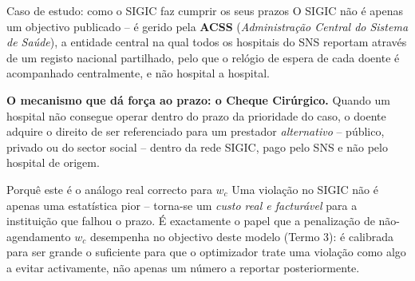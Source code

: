 \documentclass[10pt,aspectratio=169]{beamer}
\begin{document}
\begin{frame}{Caso de estudo: como o SIGIC faz cumprir os seus prazos}
  O SIGIC n\~ao \'e apenas um objectivo publicado -- \'e gerido pela
  \textbf{ACSS} (\emph{Administra\c{c}\~ao Central do Sistema de
  Sa\'ude}), a entidade central na qual todos os hospitais do SNS
  reportam atrav\'es de um registo nacional partilhado, pelo que o
  rel\'ogio de espera de cada doente \'e acompanhado centralmente,
  e n\~ao hospital a hospital.

  \vspace{0.4em}
  \textbf{O mecanismo que d\'a for\c{c}a ao prazo: o Cheque
  Cir\'urgico.} Quando um hospital n\~ao consegue operar dentro do
  prazo da prioridade do caso, o doente adquire o direito de ser
  referenciado para um prestador \emph{alternativo} -- p\'ublico,
  privado ou do sector social -- dentro da rede SIGIC, pago pelo SNS
  e n\~ao pelo hospital de origem.

  \pause
  \begin{block}{Porqu\^e este \'e o an\'alogo real correcto para $w_c$}
    Uma viola\c{c}\~ao no SIGIC n\~ao \'e apenas uma estat\'istica
    pior -- torna-se um \emph{custo real e factur\'avel} para a
    institui\c{c}\~ao que falhou o prazo. \'E exactamente o papel que
    a penaliza\c{c}\~ao de n\~ao-agendamento $w_c$ desempenha no
    objectivo deste modelo (Termo 3): \'e calibrada para ser grande o
    suficiente para que o optimizador trate uma viola\c{c}\~ao como
    algo a evitar activamente, n\~ao apenas um n\'umero a reportar
    posteriormente.
  \end{block}
\end{frame}
\end{document}
